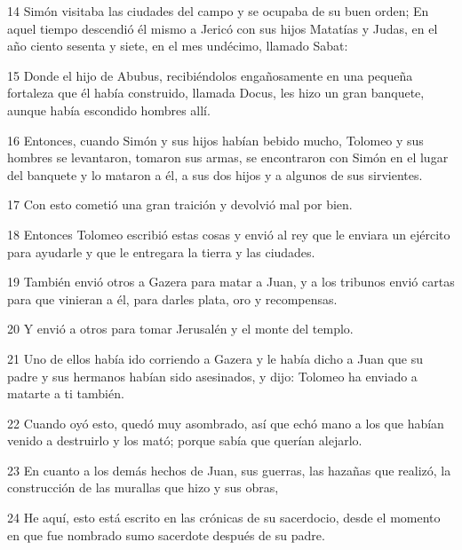 \par 14 Simón visitaba las ciudades del campo y se ocupaba de su buen orden; En aquel tiempo descendió él mismo a Jericó con sus hijos Matatías y Judas, en el año ciento sesenta y siete, en el mes undécimo, llamado Sabat:
\par 15 Donde el hijo de Abubus, recibiéndolos engañosamente en una pequeña fortaleza que él había construido, llamada Docus, les hizo un gran banquete, aunque había escondido hombres allí.
\par 16 Entonces, cuando Simón y sus hijos habían bebido mucho, Tolomeo y sus hombres se levantaron, tomaron sus armas, se encontraron con Simón en el lugar del banquete y lo mataron a él, a sus dos hijos y a algunos de sus sirvientes.
\par 17 Con esto cometió una gran traición y devolvió mal por bien.
\par 18 Entonces Tolomeo escribió estas cosas y envió al rey que le enviara un ejército para ayudarle y que le entregara la tierra y las ciudades.
\par 19 También envió otros a Gazera para matar a Juan, y a los tribunos envió cartas para que vinieran a él, para darles plata, oro y recompensas.
\par 20 Y envió a otros para tomar Jerusalén y el monte del templo.
\par 21 Uno de ellos había ido corriendo a Gazera y le había dicho a Juan que su padre y sus hermanos habían sido asesinados, y dijo: Tolomeo ha enviado a matarte a ti también.
\par 22 Cuando oyó esto, quedó muy asombrado, así que echó mano a los que habían venido a destruirlo y los mató; porque sabía que querían alejarlo.
\par 23 En cuanto a los demás hechos de Juan, sus guerras, las hazañas que realizó, la construcción de las murallas que hizo y sus obras,
\par 24 He aquí, esto está escrito en las crónicas de su sacerdocio, desde el momento en que fue nombrado sumo sacerdote después de su padre.

